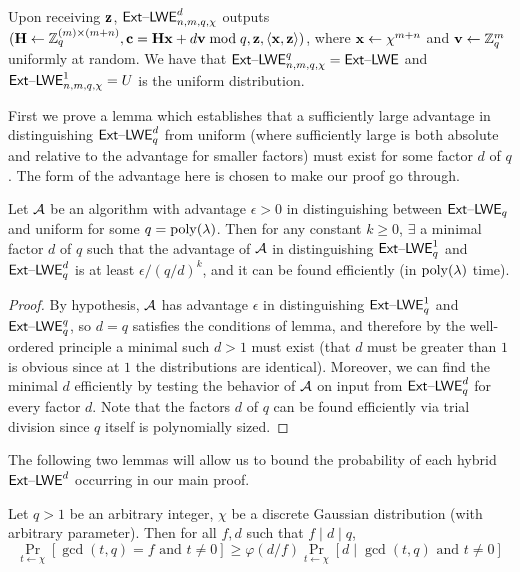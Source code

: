 Upon
receiving $\mathbf{z}$, $\mathsf{Ext \text{\textendash} LWE}_{n,m,q,\chi}^{d}$ outputs $(\mathbf{H} \gets \mathbb{Z}_q^{(m) \times (m+n)}, \mathbf{c}=\mathbf{H}\mathbf{x}+d\mathbf{v}
\bmod{q}, \mathbf{z}, \langle\mathbf{x},\mathbf{z}\rangle)$,
where $\mathbf{x} \gets \chi^{m+n}$ and $\mathbf{v} \gets \mathbb{Z}_q^{m}$ uniformly at
random. We have that $\mathsf{Ext \text{\textendash} LWE}_{n,m,q,\chi}^{q}=\mathsf{Ext \text{\textendash} LWE}$ and
$\mathsf{Ext \text{\textendash} LWE}_{n,m,q,\chi}^1=U$ is the uniform distribution.

First we prove a lemma which establishes that a sufficiently large
advantage in distinguishing $\mathsf{Ext \text{\textendash} LWE}_q^d$ from uniform (where sufficiently large is
both absolute and relative to the advantage for smaller factors) must exist for
some factor $d$ of $q$. The form of the advantage here is chosen to
make our proof go through. 
 
\begin{lemma}\label{lem:general_mod}
  Let $\mathcal{A}$ be an algorithm with advantage $\epsilon>0$ in
  distinguishing between $\mathsf{Ext \text{\textendash} LWE}_q$ and uniform for some
  $q=\operatorname{poly}(\lambda)$. Then for any constant $k \geq 0$, $\exists$ a minimal
  factor $d$ of $q$ such that the advantage of $\mathcal{A}$ in
  distinguishing $\mathsf{Ext \text{\textendash} LWE}_q^{1}$ and $\mathsf{Ext \text{\textendash} LWE}_q^{d}$ is at least
  $\epsilon/(q/d)^k$, and it can be found efficiently (in
  $\operatorname{poly}(\lambda)$ time).
\end{lemma}

\begin{proof}
  By hypothesis, $\mathcal{A}$ has advantage $\epsilon$ in distinguishing
  $\mathsf{Ext \text{\textendash} LWE}_q^{1}$ and $\mathsf{Ext \text{\textendash} LWE}_q^{q}$, so $d=q$ satisfies the
  conditions of lemma, and therefore by the well-ordered principle a
  minimal such $d>1$ must exist (that $d$ must be greater than $1$ is
  obvious since at $1$ the distributions are identical). Moreover, we
  can find the minimal $d$ efficiently by testing the behavior of
  $\mathcal{A}$ on input from $\mathsf{Ext \text{\textendash} LWE}_{q}^{d}$ for every factor $d$. Note
  that the factors $d$ of $q$ can be found efficiently via trial
  division since $q$ itself is polynomially sized.
\end{proof}

The following two lemmas will allow us to bound the probability of
each hybrid $\mathsf{Ext \text{\textendash} LWE}^{d}$ occurring in our main proof.

\begin{lemma}\label{lem:monotonicity}Let $q>1$ be an arbitrary integer,
  $\chi$ be a discrete Gaussian distribution (with arbitrary parameter).
Then for all $f, d$ such that $f \mid d \mid q$, 
\[\Pr_{t \gets \chi}[\gcd(t,q)=f \text{ and } t \neq 0] \geq \varphi(d/f)\Pr_{t
  \gets \chi}[d \mid \gcd(t,q) \text{ and } t \neq 0]\]
\end{lemma}


